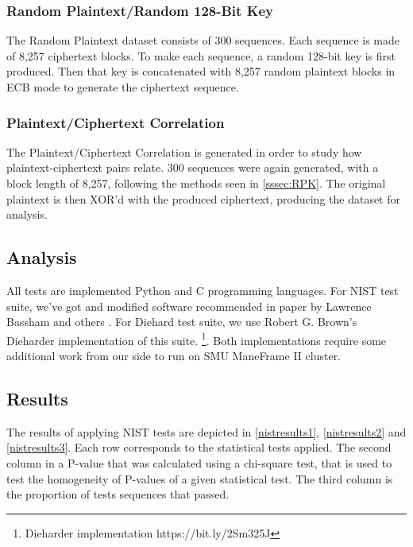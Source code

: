 \documentclass[conference]{IEEEtran}
\begin{document}
\subsubsection{Random Plaintext/Random 128-Bit Key} \label{sssec:RPK}
The Random Plaintext dataset consists of 300 sequences. Each sequence is made of 8,257 ciphertext blocks. To make each sequence, a random 128-bit key is first produced. Then that key is concatenated with 8,257 random plaintext blocks in ECB mode to generate the ciphertext sequence. 
\subsubsection{Plaintext/Ciphertext Correlation}
The Plaintext/Ciphertext Correlation is generated in order to study how plaintext-ciphertext pairs relate. 300 sequences were again generated, with a block length of 8,257, following the methods seen in \autoref{sssec:RPK}. The original plaintext is then XOR'd with the produced ciphertext, producing the dataset for analysis.
	
\subsection{Analysis}

All tests are implemented Python and C programming languages. For NIST test suite, we've got and modified software recommended in paper by Lawrence Bassham and others \cite{nisttests}. For Diehard test suite, we use Robert G. Brown’s Dieharder implementation of this suite. \footnote{Dieharder implementation https://bit.ly/2Sm325J}. Both implementations require some additional work from our side to run on SMU ManeFrame II cluster.

\subsection{Results}

The results of applying NIST tests are depicted in \autoref{nistresults1}, \autoref{nistresults2} and \autoref{nistresults3}. Each row corresponds to the statistical tests applied. The second column in a P-value that was calculated using a chi-square test, that is used to test the homogeneity of P-values of a given statistical test. The third column is the proportion of tests sequences that passed.
\end{document}
